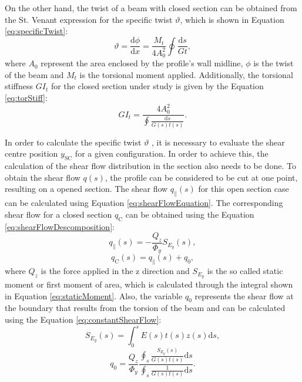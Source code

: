   On the other hand, the twist of a beam with closed section can be obtained from the St. Venant expression for the specific twist $\vartheta$, which is shown in Equation \ref{eq:specificTwist}:
  \begin{equation}\label{eq:specificTwist}
    \vartheta = \frac{\mathrm{d} \phi}{\mathrm{d} x} = \frac{M_t}{4 A_0^2} \oint \frac{\mathrm{d} s}{Gt},
  \end{equation}
  where $A_0$ represent the area enclosed by the profile's wall midline, $\phi$ is the twist of the beam and $M_t$ is the torsional moment applied. Additionally, the torsional stiffness $G I_t$ for the closed section under study is given by the Equation \ref{eq:torStiff}:
  \begin{equation}\label{eq:torStiff}
    G I_t = \frac{4 A_0^2}{\oint \frac{\mathrm{d} s}{G(s) t(s)}}.
  \end{equation}

  In order to calculate the specific twist $\vartheta$ , it is necessary to evaluate the shear centre position $y_{\mathrm{SC}}$ for a given configuration. In order to achieve this, the calculation of the shear flow distribution in the section also needs to be done. To obtain the shear flow $q(s)$, the profile can be considered to be cut at one point, resulting on a opened section. The shear flow $q_{\parallel}(s)$ for this open section case can be calculated using Equation \ref{eq:shearFlowEquation}. The corresponding shear flow for a closed section $q_{\mathrm{C}}$ can be obtained using the Equation \ref{eq:shearFlowDescomposition}:
  \begin{equation}\label{eq:shearFlowEquation}
    q_{\parallel}(s) = - \frac{Q_z}{\Phi_y} S_{E_y}(s),
  \end{equation}
  \begin{equation}\label{eq:shearFlowDescomposition}
    q_{\mathrm{C}}(s) = q_\parallel(s) + q_0,
  \end{equation}
  where $Q_z$ is the force applied in the z direction and $S_{E_y}$ is the so called static moment or first moment of area, which is calculated through the integral shown in Equation \ref{eq:staticMoment}. Also, the variable $q_0$ represents the shear flow at the boundary that results from the torsion of the beam and can be calculated using the Equation \ref{eq:constantShearFlow}:
  \begin{equation}\label{eq:staticMoment}
    S_{E_y}(s) = \int_0^s E(s) t(s) z(s) \mathrm{d}s,
  \end{equation}
  \begin{equation}\label{eq:constantShearFlow}
    q_0 = \frac{Q_z}{\Phi_y} \frac{ \oint_s \frac{S_{E_y}(s)}{G(s) t(s)} \mathrm{d}s }{ \oint_s \frac{1}{G(s) t(s)} \mathrm{d}s }.
  \end{equation}

